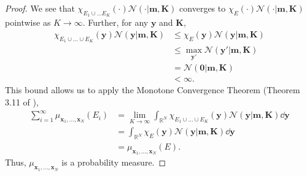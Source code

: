 \begin{proof}
    We see that $\chi_{E_1 \cup \dots E_K}(\cdot)\mathcal{N}(\cdot | \mathbf{m}, \mathbf{K})$ converges to $\chi_E(\cdot) \mathcal{N}(\cdot | \mathbf{m}, \mathbf{K})$ pointwise as $K \to \infty$.
    Further, for any $\mathbf{y}$ and $\mathbf{K}$,
    \begin{align*}
        \chi_{E_1 \cup \dots \cup E_K}(\mathbf{y}) \mathcal{N}(\mathbf{y} | \mathbf{m}, \mathbf{K})
        & \leq \chi_E(\mathbf{y}) \mathcal{N}(\mathbf{y} | \mathbf{m}, \mathbf{K}) \\
        & \leq \max_{\mathbf{y}'}\mathcal{N}(\mathbf{y'} | \mathbf{m}, \mathbf{K}) \\
        & = \mathcal{N}( \mathbf{0} | \mathbf{m}, \mathbf{K}) \\
        & < \infty.
    \end{align*}
    This bound allows us to apply the Monotone Convergence Theorem (Theorem 3.11 of \cite{axler2020}),
    \begin{align*}
        \sum_{i = 1}^{\infty} \mu_{\mathbf{x}_1, \dots, \mathbf{x}_N}(E_i)
        & = \lim_{K \to \infty}\int_{\mathbb{R}^{N}} \chi_{E_1 \cup \dots \cup E_K}(\mathbf{y})\mathcal{N}(\mathbf{y} | \mathbf{m}, \mathbf{K}) \dd \mathbf{y} \\
        & = \int_{\mathbb{R}^{N}} \chi_{E}(\mathbf{y})\mathcal{N}(\mathbf{y} | \mathbf{m}, \mathbf{K}) \dd \mathbf{y} \\
        & = \mu_{\mathbf{x}_1, \dots, \mathbf{x}_N}(E).
    \end{align*}
    Thus, $\mu_{\mathbf{x}_1, \dots, \mathbf{x}_N}$ is a probability measure.


\end{proof}
